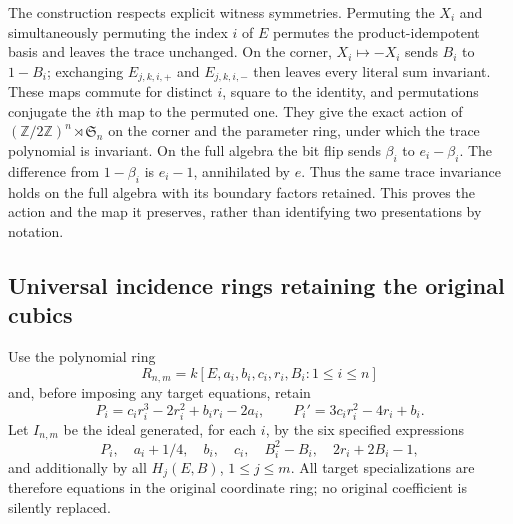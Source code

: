 The construction respects explicit witness symmetries. Permuting the
$X_i$ and simultaneously permuting the index $i$ of $E$ permutes
the product-idempotent basis and leaves the trace unchanged.
On the corner, $X_i\mapsto-X_i$ sends $B_i$ to $1-B_i$;
exchanging $E_{j,k,i,+}$ and $E_{j,k,i,-}$ then leaves every literal
sum invariant. These maps commute for distinct $i$, square to the
identity, and permutations conjugate the $i$th map to the permuted
one. They give the exact action of
$(\mathbb Z/2\mathbb Z)^n\rtimes\mathfrak S_n$ on the corner
and the parameter ring, under which the trace polynomial is invariant.
On the full algebra the bit flip sends $\beta_i$ to $e_i-\beta_i$.
The difference from $1-\beta_i$ is $e_i-1$, annihilated by $e$.
Thus the same trace invariance holds on the full algebra with its
boundary factors retained. This proves the action and the map it
preserves, rather than identifying two presentations by notation.

\subsection{Universal incidence rings retaining the original cubics}

Use the polynomial ring
\[
 R_{n,m}=k[E,a_i,b_i,c_i,r_i,B_i:1\le i\le n]
\]
and, before imposing any target equations, retain
\[
 P_i=c_ir_i^3-2r_i^2+b_ir_i-2a_i,\qquad
 P_i'=3c_ir_i^2-4r_i+b_i.
\]
Let $I_{n,m}$ be the ideal generated, for each $i$, by the six
specified expressions
\[
 P_i,\quad a_i+1/4,\quad b_i,\quad c_i,\quad
 B_i^2-B_i,\quad 2r_i+2B_i-1,
\]
and additionally by all $H_j(E,B)$, $1\le j\le m$.
All target specializations are therefore equations in the original
coordinate ring; no original coefficient is silently replaced.

